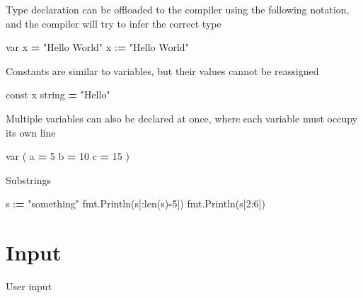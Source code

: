 \documentclass[]{book}
\newenvironment{Shaded}{\begin{snugshade}}{\end{snugshade}}
\newcommand{\DecValTok}[1]{\textcolor[rgb]{0.00,0.00,0.81}{#1}}
\newcommand{\SpecialCharTok}[1]{\textcolor[rgb]{0.00,0.00,0.00}{#1}}
\newcommand{\StringTok}[1]{\textcolor[rgb]{0.31,0.60,0.02}{#1}}
\newcommand{\OperatorTok}[1]{\textcolor[rgb]{0.81,0.36,0.00}{\textbf{#1}}}
\newcommand{\BuiltInTok}[1]{#1}
\newcommand{\NormalTok}[1]{#1}
\begin{document}
Type declaration can be offloaded to the compiler using the following
notation, and the compiler will try to infer the correct type

\begin{Shaded}
\begin{Highlighting}[]
\NormalTok{var x }\OperatorTok{=} \StringTok{"Hello World"}
\NormalTok{x :}\OperatorTok{=} \StringTok{"Hello World"}
\end{Highlighting}
\end{Shaded}

Constants are similar to variables, but their values cannot be
reassigned

\begin{Shaded}
\begin{Highlighting}[]
\NormalTok{const x string }\OperatorTok{=} \StringTok{"Hello"}
\end{Highlighting}
\end{Shaded}

Multiple variables can also be declared at once, where each variable
must occupy its own line

\begin{Shaded}
\begin{Highlighting}[]
\NormalTok{var (}
\NormalTok{    a }\OperatorTok{=} \DecValTok{5}
\NormalTok{    b }\OperatorTok{=} \DecValTok{10}
\NormalTok{    c }\OperatorTok{=} \DecValTok{15}
\NormalTok{)}
\end{Highlighting}
\end{Shaded}

Substrings

\begin{Shaded}
\begin{Highlighting}[]
\NormalTok{s :}\OperatorTok{=} \StringTok{"something"}
\NormalTok{fmt.Println(s[:}\BuiltInTok{len}\NormalTok{(s)}\OperatorTok{-}\DecValTok{5}\NormalTok{])}
\NormalTok{fmt.Println(s[}\DecValTok{2}\NormalTok{:}\DecValTok{6}\NormalTok{])}
\end{Highlighting}
\end{Shaded}

\section{Input}\label{input}

User input

\begin{Shaded}
\end{Shaded}
\end{document}

